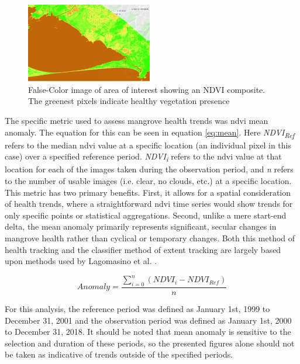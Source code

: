 \begin{figure}[H] 
\centering
\includegraphics[width=0.49\textwidth]{Figures/chap4/guaratiba_ndvi.png}
\caption[False-Color image of area of interest showing an NDVI composite]{False-Color image of area of interest showing an NDVI composite. The greenest pixels indicate healthy vegetation presence}
\label{fig:gndvi}
\end{figure}

The specific metric used to assess mangrove health trends was \ac{ndvi} mean anomaly. The equation for this can be seen in equation \ref{eq:mean}. Here \textit{NDVI\textsubscript{Ref}} refers to the median \ac{ndvi} value at a specific location (an individual pixel in this case) over a specified reference period. \textit{NDVI\textsubscript{i}} refers to the \ac{ndvi} value at that location for each of the images taken during the observation period, and \textit{n} refers to the number of usable images (i.e. clear, no clouds, etc.) at a specific location. This metric has two primary benefits. First, it allows for a spatial consideration of health trends, where a straightforward \ac{ndvi} time series would show trends for only specific points or statistical aggregations. Second, unlike a mere start-end delta, the mean anomaly primarily represents significant, secular changes in mangrove health rather than cyclical or temporary changes. Both this method of health tracking and the classifier method of extent tracking are largely based upon methods used by Lagomasino et al. \cite{lagomasinoMeasuringMangroveCarbon2019, goldbergGlobalDeclinesHuman2020}.

\begin{equation}
\label{eq:mean}
Anomaly = \frac{\sum_{i=0}^{n} (NDVI_i - NDVI_{Ref})}{n}
\end{equation}

For this analysis, the reference period was defined as January 1st, 1999 to December 31, 2001 and the observation period was defined as January 1st, 2000 to December 31, 2018. It should be noted that mean anomaly is sensitive to the selection and duration of these periods, so the presented figures alone should not be taken as indicative of trends outside of the specified periods. 

